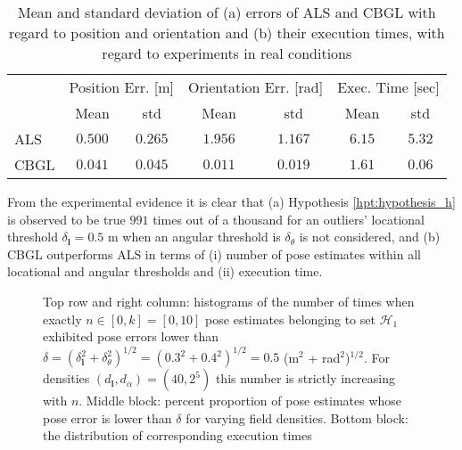 \begin{table}[]\footnotesize
\begin{tabular}{@{}lcccccc@{}}
     & \multicolumn{2}{l}{Position Err. {[}m{]}} & \multicolumn{2}{l}{Orientation Err. {[}rad{]}} & \multicolumn{2}{l}{Exec. Time {[}sec{]}} \\
     & Mean              & std              & Mean                & std                 & Mean                & std                \\ \midrule
ALS  & $0.500 $          & $0.265 $         & $1.956 $            & $1.167 $            & $6.15 $             & $5.32 $            \\
CBGL & $0.041 $          & $0.045 $         & $0.011 $            & $0.019 $            & $1.61 $             & $0.06 $            \\ \bottomrule
\end{tabular}
  \caption{\small Mean and standard deviation of (a) errors of ALS and CBGL with
                regard to position and orientation and (b) their execution times,
                with regard to experiments in real conditions}
\label{tbl:a}
  \vspace{-0.5cm}
\end{table}

From the experimental evidence it is clear that (a) Hypothesis
\ref{hpt:hypothesis_h} is observed to be true $991$ times out of a thousand for
an outliers' locational threshold $\delta_{\bm{l}} = 0.5$ m when an angular
threshold is $\delta_{\theta}$ is not considered, and (b) CBGL outperforms ALS
in terms of (i) number of pose estimates within all locational and angular
thresholds and (ii) execution time.



\begin{figure}
  \vspace{-0.3cm}
  
  \vspace{-0.3cm}
  \caption{\small Top row and right column: histograms of the number of times
           when exactly $n \in [0,k] = [0,10]$ pose estimates belonging to set
           $\mathcal{H}_1$ exhibited pose errors lower than $\delta =
           (\delta_{\bm{l}}^2 + \delta_{\theta}^2)^{1/2} =  (0.3^2 +
           0.4^2)^{1/2} = 0.5$ (m$^2$ + rad$^2$)$^{1/2}$. For densities
           $(d_{\bm{l}},d_{\alpha}) = (40, 2^5)$ this number is strictly
           increasing with $n$. Middle block: percent proportion of pose
           estimates whose pose error is lower than $\delta$ for varying field
           densities. Bottom block: the distribution of corresponding execution
           times}
  \vspace{-0.5cm}
  \label{fig:a:determine_40_32}
\end{figure}


